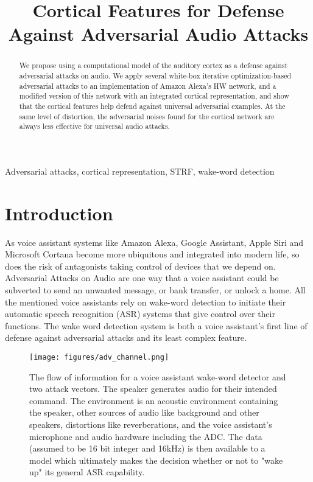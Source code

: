 \documentclass{article}
\title{Cortical Features for Defense Against Adversarial Audio Attacks}
\begin{document}
%
\maketitle
%
\begin{abstract}
We propose using a computational model of the auditory cortex as a defense against adversarial attacks on audio.
We apply several white-box iterative optimization-based adversarial attacks to an implementation of Amazon Alexa's HW network, and a modified version of this network with an integrated cortical representation, and show that the cortical features help defend against universal adversarial examples.
At the same level of distortion, the adversarial noises found for the cortical network are always less effective for universal audio attacks.
\end{abstract}
%
\begin{keywords}
Adversarial attacks, cortical representation, STRF, wake-word detection
\end{keywords}
%
\section{Introduction}
\label{sec:intro}
%
As voice assistant systems like Amazon Alexa, Google Assistant, Apple Siri and Microsoft Cortana become more ubiquitous and integrated into modern life, so does the risk of antagonists taking control of devices that we depend on.
Adversarial Attacks on Audio \cite{fgsm} are one way that a voice assistant could be subverted to send an unwanted message, or bank transfer, or unlock a home.
All the mentioned voice assistants rely on wake-word detection to initiate their automatic speech recognition (ASR) systems that give control over their functions.
The wake word detection system is both a voice assistant's first line of defense against adversarial attacks and its least complex feature.
%
\begin{figure}[t!]
	\centering
		\centering
		\texttt{[image: figures/adv\_channel.png]}
	\caption{The flow of information for a voice assistant wake-word detector and two attack vectors. The speaker generates audio for their intended command. The environment is an acoustic environment containing the speaker, other sources of audio like background and other speakers, distortions like reverberations, and the voice assistant's microphone and audio hardware including the ADC. The data (assumed to be 16 bit integer and 16kHz) is then available to a model which ultimately makes the decision whether or not to "wake up" its general ASR capability.}
	\label{fig:adv_channel}
\end{figure}
\end{document}
